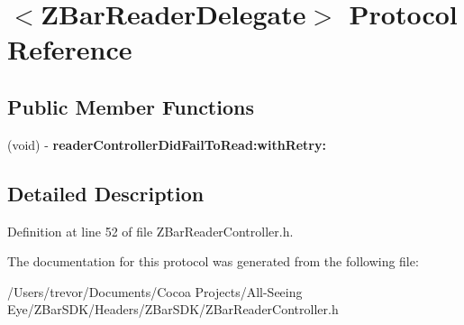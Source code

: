 \hypertarget{protocol_z_bar_reader_delegate-p}{
\section{$<$ZBarReaderDelegate$>$ Protocol Reference}
\label{protocol_z_bar_reader_delegate-p}
}
\subsection*{Public Member Functions}
\begin{DoxyCompactItemize}
\item 
\hypertarget{protocol_z_bar_reader_delegate-p_a78a7b11efe806cd765a8bab093b029d3}{
(void) -\/ {\bfseries readerControllerDidFailToRead:withRetry:}}
\label{protocol_z_bar_reader_delegate-p_a78a7b11efe806cd765a8bab093b029d3}

\end{DoxyCompactItemize}


\subsection{Detailed Description}


Definition at line 52 of file ZBarReaderController.h.



The documentation for this protocol was generated from the following file:\begin{DoxyCompactItemize}
\item 
/Users/trevor/Documents/Cocoa Projects/All-\/Seeing Eye/ZBarSDK/Headers/ZBarSDK/ZBarReaderController.h\end{DoxyCompactItemize}
